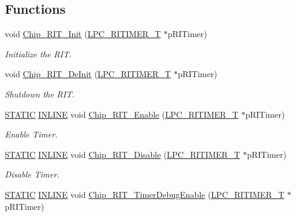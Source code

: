 \subsection*{Functions}
\begin{DoxyCompactItemize}
\item 
void \hyperlink{group___r_i_t_i_m_e_r__18_x_x__43_x_x_ga9a8dc91573ba6d4556d787a62a8a3f7e}{Chip\+\_\+\+R\+I\+T\+\_\+\+Init} (\hyperlink{struct_l_p_c___r_i_t_i_m_e_r___t}{L\+P\+C\+\_\+\+R\+I\+T\+I\+M\+E\+R\+\_\+T} $\ast$p\+R\+I\+Timer)
\begin{DoxyCompactList}\small\item\em Initialize the R\+IT. \end{DoxyCompactList}\item 
void \hyperlink{group___r_i_t_i_m_e_r__18_x_x__43_x_x_ga31be6db37bc84b88664bd37e537bb881}{Chip\+\_\+\+R\+I\+T\+\_\+\+De\+Init} (\hyperlink{struct_l_p_c___r_i_t_i_m_e_r___t}{L\+P\+C\+\_\+\+R\+I\+T\+I\+M\+E\+R\+\_\+T} $\ast$p\+R\+I\+Timer)
\begin{DoxyCompactList}\small\item\em Shutdown the R\+IT. \end{DoxyCompactList}\item 
\hyperlink{group___l_p_c___types___public___macros_ga10b2d890d871e1489bb02b7e70d9bdfb}{S\+T\+A\+T\+IC} \hyperlink{spifi__18xx__43xx_8h_a2eb6f9e0395b47b8d5e3eeae4fe0c116}{I\+N\+L\+I\+NE} void \hyperlink{group___r_i_t_i_m_e_r__18_x_x__43_x_x_gaba98c3b55b7ca11112f49974f2cd6288}{Chip\+\_\+\+R\+I\+T\+\_\+\+Enable} (\hyperlink{struct_l_p_c___r_i_t_i_m_e_r___t}{L\+P\+C\+\_\+\+R\+I\+T\+I\+M\+E\+R\+\_\+T} $\ast$p\+R\+I\+Timer)
\begin{DoxyCompactList}\small\item\em Enable Timer. \end{DoxyCompactList}\item 
\hyperlink{group___l_p_c___types___public___macros_ga10b2d890d871e1489bb02b7e70d9bdfb}{S\+T\+A\+T\+IC} \hyperlink{spifi__18xx__43xx_8h_a2eb6f9e0395b47b8d5e3eeae4fe0c116}{I\+N\+L\+I\+NE} void \hyperlink{group___r_i_t_i_m_e_r__18_x_x__43_x_x_ga5ef90f2824763c979997e64ea8d6991b}{Chip\+\_\+\+R\+I\+T\+\_\+\+Disable} (\hyperlink{struct_l_p_c___r_i_t_i_m_e_r___t}{L\+P\+C\+\_\+\+R\+I\+T\+I\+M\+E\+R\+\_\+T} $\ast$p\+R\+I\+Timer)
\begin{DoxyCompactList}\small\item\em Disable Timer. \end{DoxyCompactList}\item 
\hyperlink{group___l_p_c___types___public___macros_ga10b2d890d871e1489bb02b7e70d9bdfb}{S\+T\+A\+T\+IC} \hyperlink{spifi__18xx__43xx_8h_a2eb6f9e0395b47b8d5e3eeae4fe0c116}{I\+N\+L\+I\+NE} void \hyperlink{group___r_i_t_i_m_e_r__18_x_x__43_x_x_gafc64603f85a635e7c6ebe67346fdafe4}{Chip\+\_\+\+R\+I\+T\+\_\+\+Timer\+Debug\+Enable} (\hyperlink{struct_l_p_c___r_i_t_i_m_e_r___t}{L\+P\+C\+\_\+\+R\+I\+T\+I\+M\+E\+R\+\_\+T} $\ast$p\+R\+I\+Timer)

\end{DoxyCompactItemize}
